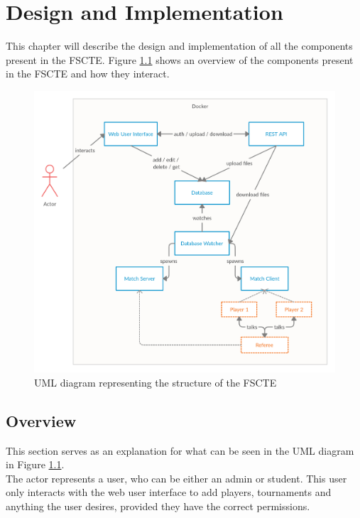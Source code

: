 \documentclass[a4paper, 12pt]{report}
\begin{document}
\chapter{Design and Implementation}
\label{chap:design}

This chapter will describe the design and implementation of all the components
present in the FSCTE. Figure \ref{fig:uml-structure} shows an overview of the
components present in the FSCTE and how they interact.
\begin{figure}[H]
	\centering
	\includegraphics[scale=0.25]{uml-structure.png}
	\caption{UML diagram representing the structure of the FSCTE}
	\label{fig:uml-structure}
\end{figure}

\section{Overview}

This section serves as an explanation for what can be seen in the UML diagram in
Figure \ref{fig:uml-structure}. \\

The actor represents a user, who can be either an admin or student. This user
only interacts with the web user interface to add players, tournaments and anything
the user desires, provided they have the correct permissions. \\
\end{document}
